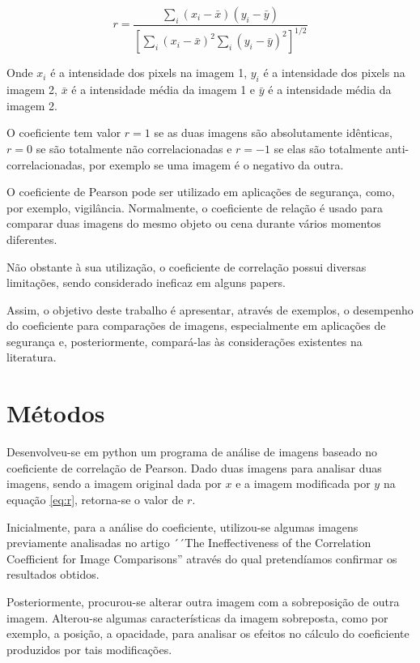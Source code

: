 \documentclass[10pt,a4paper]{article}
\begin{document}
\begin{equation}r = \frac{  
\displaystyle{\sum_{i} (x_i-\bar{x})(y_i-  
\bar{y})}}{\displaystyle{\left[  
\sum_{i}(x_i-\bar{x})^2  
\sum_{i}(y_i-\bar{y})^2\right]^{1/2}}}  \label{eq:r}
\end{equation}  

Onde $x_i$ é a intensidade dos pixels na imagem 1, $y_i$ é a
intensidade dos pixels na imagem 2, $\bar{x}$ é a intensidade média da
imagem 1 e $\bar{y}$ é a intensidade média da imagem 2.

O coeficiente tem valor $r=1$ se as duas imagens são absolutamente
idênticas, $r=0$ se são totalmente não correlacionadas e $r=-1$ se elas
são totalmente anti-correlacionadas, por exemplo se uma imagem é o
negativo da outra.

O coeficiente de Pearson pode ser utilizado em
aplicações de segurança, como, por exemplo, vigilância. Normalmente, 
o coeficiente de relação é usado para comparar duas imagens do mesmo
objeto ou cena durante vários momentos diferentes.

Não obstante à sua utilização, o coeficiente de correlação possui
diversas limitações, sendo considerado ineficaz em alguns papers.%
 
Assim, o objetivo deste trabalho é apresentar, através de exemplos, o
desempenho do coeficiente para comparações de imagens, especialmente
em aplicações de segurança e, posteriormente, compará-las às considerações existentes na literatura.


\section{Métodos}

Desenvolveu-se em python um programa de análise de imagens baseado no
coeficiente de correlação de Pearson. 
Dado duas imagens para analisar duas imagens, sendo a imagem original dada por $x$  e a
imagem modificada por $y$ na equação \eqref{eq:r}, retorna-se o valor de $r$.

Inicialmente, para a análise do coeficiente, utilizou-se algumas imagens
previamente analisadas no artigo ´´The Ineffectiveness of the Correlation
Coefficient for Image Comparisons'' através do qual pretendíamos
confirmar os resultados obtidos.

Posteriormente, procurou-se alterar outra imagem com a
sobreposição de outra imagem. Alterou-se algumas características da
imagem sobreposta, como por exemplo, a posição, a opacidade, para
analisar os efeitos no cálculo do coeficiente produzidos por tais modificações. 
\end{document}
